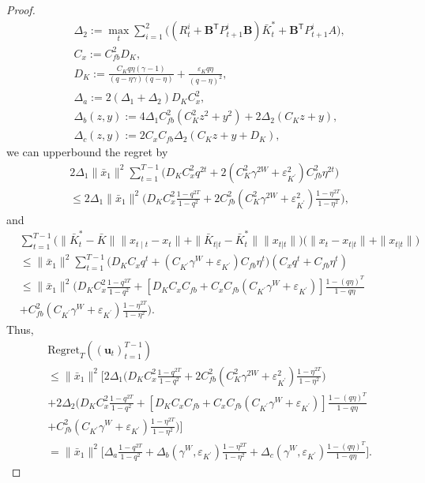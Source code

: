 \documentclass{article}
\newcommand{\transpose}{\mathsf{T}}
\begin{document}
\begin{proof}
\begin{align*}
    &\Delta_{2} := \max_{t} \sum_{i=1}^{2}\bigg( (R_{t}^{i}+\mathbf{B}^{\transpose}P_{t+1}^{i}\mathbf{B})\bar{K}_{t}^{*}+\mathbf{B}^{\transpose}P_{t+1}^{i}A\bigg),\\
    &C_{x} := C_{fb}^{2}D_{K},\\
    &D_{K} := \frac{C_{K}q\eta(\gamma-1)}{(q-\eta\gamma)(q-\eta)} + \frac{\varepsilon_{K}q\eta}{(q-\eta)^{2}},\\
    &\Delta_{a} := 2(\Delta_{1}+\Delta_{2})D_{K}C_{x}^{2},\\
    &\Delta_{b}(z,y) := 4\Delta_{1}C_{fb}^{2}(C_{K}^{2}z^{2}+y^{2})+2\Delta_{2}(C_{K}z+y),\\
    &\Delta_{c}(z,y) := 2C_{x}C_{fb}\Delta_{2}(C_{K}z+y+D_{K}),
\end{align*}
we can upperbound the regret by
\begin{align*}
    &2\Delta_{1}\|\bar{x}_{1}\|^{2}\sum_{t=1}^{T-1}\bigg(D_{K}C_{x}^{2}q^{2t} + 2(C_{K}^{2}\gamma^{2W}+\varepsilon_{K^{'}}^{2})C_{fb}^{2}\eta^{2t}\bigg) \\
    &\leq 2\Delta_{1}\|\bar{x}_{1}\|^{2}\bigg(D_{K}C_{x}^{2}\frac{1-q^{2T}}{1-q^{2}} + 2C_{fb}^{2}(C_{K}^{2}\gamma^{2W}+\varepsilon_{K^{'}}^{2})\frac{1-\eta^{2T}}{1-\eta^{2}} \bigg),
\end{align*}
and
\begin{align*}
    &\sum_{t=1}^{T-1}\bigg( \|\bar{K}_{t}^{*}-\bar{K}\|\|x_{t\mid t}-x_{t}\|  + \|\bar{K}_{t|t}-\bar{K}_{t}^{*}\| \|x_{t|t}\|\bigg)\bigg(\|x_{t}-x_{t|t}\| + \|x_{t|t}\|\bigg)\\
    &\leq \|\bar{x}_{1}\|^{2}\sum_{t=1}^{T-1}\bigg(D_{K}C_{x}q^{t}+(C_{K^{'}}\gamma^{W}+\varepsilon_{K^{'}})C_{fb}\eta^{t}\bigg)(C_{x}q^{t}+C_{fb}\eta^{t})\\
    &\leq \|\bar{x}_{1}\|^{2}\bigg(D_{K}C_{x}^{2}\frac{1-q^{2T}}{1-q^{2}}+[D_{K}C_{x}C_{fb}+C_{x}C_{fb}(C_{K^{'}}\gamma^{W}+\varepsilon_{K^{'}})]\frac{1-(q\eta)^{T}}{1-q\eta}\\
    &+ C_{fb}^{2}(C_{K^{'}}\gamma^{W}+\varepsilon_{K^{'}})\frac{1-\eta^{2T}}{1-\eta^{2}} \bigg).
\end{align*}
Thus,
\begin{align*}
    &\text{Regret}_{T}((\mathbf{u}_{t})_{t=1}^{T-1})\\
    &\leq \|\bar{x}_{1}\|^{2}\bigg[ 2\Delta_{1}\bigg(D_{K}C_{x}^{2}\frac{1-q^{2T}}{1-q^{2}} + 2C_{fb}^{2}(C_{K}^{2}\gamma^{2W}+\varepsilon_{K^{'}}^{2})\frac{1-\eta^{2T}}{1-\eta^{2}} \bigg)\\
    &+2\Delta_{2}\bigg(D_{K}C_{x}^{2}\frac{1-q^{2T}}{1-q^{2}}+[D_{K}C_{x}C_{fb}+C_{x}C_{fb}(C_{K^{'}}\gamma^{W}+\varepsilon_{K^{'}})]\frac{1-(q\eta)^{T}}{1-q\eta}\\
    &+ C_{fb}^{2}(C_{K^{'}}\gamma^{W}+\varepsilon_{K^{'}})\frac{1-\eta^{2T}}{1-\eta^{2}} \bigg)\bigg]\\
    &= \|\bar{x}_{1}\|^{2}\bigg[\Delta_{a}\frac{1-q^{2T}}{1-q^{2}} +  \Delta_{b}(\gamma^{W},\varepsilon_{K^{'}})\frac{1-\eta^{2T}}{1-\eta^{2}}+ \Delta_{c}(\gamma^{W},\varepsilon_{K^{'}})\frac{1-(q\eta)^{T}}{1-q\eta}\bigg].
\end{align*}
\end{proof}
\end{document}
